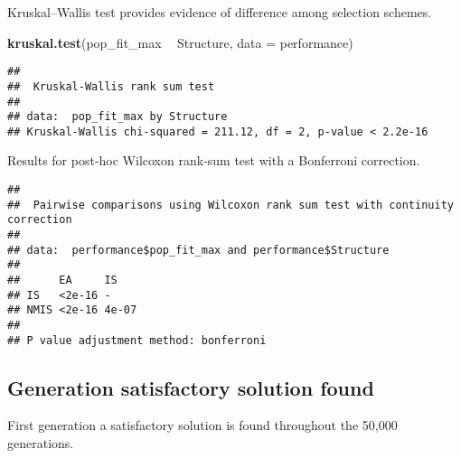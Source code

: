 \documentclass[]{book}
\newenvironment{Shaded}{\begin{snugshade}}{\end{snugshade}}
\newcommand{\DataTypeTok}[1]{\textcolor[rgb]{0.13,0.29,0.53}{#1}}
\newcommand{\KeywordTok}[1]{\textcolor[rgb]{0.13,0.29,0.53}{\textbf{#1}}}
\newcommand{\NormalTok}[1]{#1}
\newcommand{\OperatorTok}[1]{\textcolor[rgb]{0.81,0.36,0.00}{\textbf{#1}}}
\newcommand{\OtherTok}[1]{\textcolor[rgb]{0.56,0.35,0.01}{#1}}
\newcommand{\StringTok}[1]{\textcolor[rgb]{0.31,0.60,0.02}{#1}}
\begin{document}
Kruskal--Wallis test provides evidence of difference among selection schemes.

\begin{Shaded}
\begin{Highlighting}[]
\KeywordTok{kruskal.test}\NormalTok{(pop_fit_max }\OperatorTok{~}\StringTok{ }\NormalTok{Structure, }\DataTypeTok{data =}\NormalTok{ performance)}
\end{Highlighting}
\end{Shaded}

\begin{verbatim}
## 
##  Kruskal-Wallis rank sum test
## 
## data:  pop_fit_max by Structure
## Kruskal-Wallis chi-squared = 211.12, df = 2, p-value < 2.2e-16
\end{verbatim}

Results for post-hoc Wilcoxon rank-sum test with a Bonferroni correction.

\begin{Shaded}
\end{Shaded}

\begin{verbatim}
## 
##  Pairwise comparisons using Wilcoxon rank sum test with continuity correction 
## 
## data:  performance$pop_fit_max and performance$Structure 
## 
##      EA     IS   
## IS   <2e-16 -    
## NMIS <2e-16 4e-07
## 
## P value adjustment method: bonferroni
\end{verbatim}

\hypertarget{generation-satisfactory-solution-found-21}{%
\subsection{Generation satisfactory solution found}\label{generation-satisfactory-solution-found-21}}

First generation a satisfactory solution is found throughout the 50,000 generations.
\end{document}
